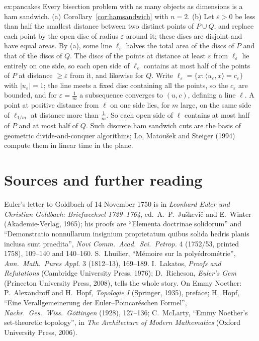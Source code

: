 \begin{solution}{ex:pancakes}
\idea Every bisection problem with as many objects as dimensions is a ham sandwich.
\writeup (a) Corollary~\ref{cor:hamsandwich} with $n=2$. (b) Let $\varepsilon>0$ be less than half the smallest distance between two distinct points of $P\cup Q$, and replace each point by the open disc of radius
$\varepsilon$ around it; these discs are disjoint and have equal areas. By (a), some line $\ell_\varepsilon$ halves the total area of the discs of $P$ and that of the discs of $Q$. The discs of the points at
distance at least $\varepsilon$ from $\ell_\varepsilon$ lie entirely on one side, so each open side of $\ell_\varepsilon$ contains at most half of the points of $P$ at distance $\ge\varepsilon$ from it, and likewise for $Q$. Write
$\ell_\varepsilon=\{x:\langle u_\varepsilon,x\rangle=c_\varepsilon\}$ with $|u_\varepsilon|=1$; the line meets a fixed disc containing all the points, so the $c_\varepsilon$ are bounded, and for $\varepsilon=\frac1m$ a subsequence converges to
$(u,c)$, defining a line $\ell$. A point at positive distance from $\ell$ on one side lies, for $m$ large, on the same side of $\ell_{1/m}$ at distance more than $\frac1m$. So each open side of $\ell$ contains
at most half of $P$ and at most half of $Q$. Such discrete ham sandwich cuts are the basis of geometric divide-and-conquer algorithms; Lo, Matou\v sek and Steiger (1994) compute them in linear time in
the plane.
\end{solution}

\section*{Sources and further reading}

Euler's letter to Goldbach of 14 November 1750 is in \emph{Leonhard Euler und Christian Goldbach: Briefwechsel 1729--1764}, ed.\ A.~P.~Juškevič and E.~Winter (Akademie-Verlag, 1965); his proofs
are ``Elementa doctrinae solidorum'' and ``Demonstratio nonnullarum insignium proprietatum quibus solida hedris planis inclusa sunt praedita'', \emph{Novi Comm.\ Acad.\ Sci.\ Petrop.} 4 (1752/53, printed 1758),
109--140 and 140--160. S.~Lhuilier, ``M\'emoire sur la poly\'edrom\'etrie'', \emph{Ann.\ Math.\ Pures Appl.} 3 (1812--13), 169--189. I.~Lakatos, \emph{Proofs and Refutations} (Cambridge University Press, 1976);
D.~Richeson, \emph{Euler's Gem} (Princeton University Press, 2008), tells the whole story. On Emmy Noether: P.~Alexandroff and H.~Hopf, \emph{Topologie I} (Springer, 1935), preface; H.~Hopf, ``Eine
Verallgemeinerung der Euler--Poincar\'eschen Formel'', \emph{Nachr.\ Ges.\ Wiss.\ G\"ottingen} (1928), 127--136; C.~McLarty, ``Emmy Noether's set-theoretic topology'', in \emph{The Architecture of Modern
Mathematics} (Oxford University Press, 2006).

